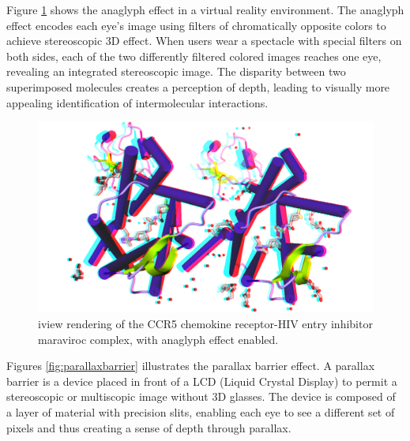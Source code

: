 Figure \ref{fig:anaglyph} shows the anaglyph effect in a virtual reality environment. The anaglyph effect encodes each eye's image using filters of chromatically opposite colors to achieve stereoscopic 3D effect. When users wear a spectacle with special filters on both sides, each of the two differently filtered colored images reaches one eye, revealing an integrated stereoscopic image. The disparity between two superimposed molecules creates a perception of depth, leading to visually more appealing identification of intermolecular interactions.
 
\begin{figure}
\begin{center}
\includegraphics[width=\linewidth]{../iview/anaglyph.png}
\end{center}
\caption{iview rendering of the CCR5 chemokine receptor-HIV entry inhibitor maraviroc complex, with anaglyph effect enabled.}
\label{fig:anaglyph}
\end{figure}

Figures \ref{fig:parallaxbarrier} illustrates the parallax barrier effect. A parallax barrier is a device placed in front of a LCD (Liquid Crystal Display) to permit a stereoscopic or multiscopic image without 3D glasses. The device is composed of a layer of material with precision slits, enabling each eye to see a different set of pixels and thus creating a sense of depth through parallax.

